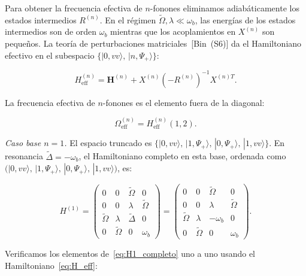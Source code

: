 \documentclass[12pt]{article}
\begin{document}
	Para obtener la frecuencia efectiva de $n$-fonones eliminamos adiab\'aticamente
	los estados intermedios $R^{(n)}$. En el r\'egimen $\widetilde{\Omega},
	\lambda \ll \omega_b$, las energ\'ias de los estados intermedios son de orden
	$\omega_b$ mientras que los acoplamientos en $X^{(n)}$ son peque\~nos. La
	teor\'ia de perturbaciones matriciales~[Bin~(S6)] da el Hamiltoniano efectivo
	en el subespacio $\{|0, vv\rangle,\, |n, \Psi_+\rangle\}$:
	
	\begin{equation}
		H_{\mathrm{eff}}^{(n)} = \mathbf{H}^{(n)}
		+ X^{(n)}\!\left(-R^{(n)}\right)^{-1}\!X^{(n)T}.
		\label{eq:Heff_pert}
	\end{equation}
	
	\noindent
	La frecuencia efectiva de $n$-fonones es el elemento fuera de la diagonal:
	
	\begin{equation}
		\Omega_{\mathrm{eff}}^{(n)} = H_{\mathrm{eff}}^{(n)}(1,2).
	\end{equation}
	
	\medskip
	\noindent
	\textit{Caso base $n = 1$.}
	El espacio truncado es $\{|0, vv\rangle,\, |1, \Psi_+\rangle,\,
	|0, \Psi_+\rangle,\, |1, vv\rangle\}$.
	En resonancia $\widetilde{\Delta} = -\omega_b$, el Hamiltoniano completo en
	esta base, ordenada como $\bigl(|0,vv\rangle,\, |1,\Psi_+\rangle,\,
	|0,\Psi_+\rangle,\, |1,vv\rangle\bigr)$, es:
	
	\begin{equation}
		H^{(1)} = \begin{pmatrix}
			0 & 0 & \widetilde{\Omega} & 0 \\
			0 & 0 & \lambda & \widetilde{\Omega} \\
			\widetilde{\Omega} & \lambda & \widetilde{\Delta} & 0 \\
			0 & \widetilde{\Omega} & 0 & \omega_b
		\end{pmatrix}
		=
		\begin{pmatrix}
			0 & 0 & \widetilde{\Omega} & 0 \\
			0 & 0 & \lambda & \widetilde{\Omega} \\
			\widetilde{\Omega} & \lambda & -\omega_b & 0 \\
			0 & \widetilde{\Omega} & 0 & \omega_b
		\end{pmatrix}.
		\label{eq:H1_completo}
	\end{equation}
	
	\noindent
	Verificamos los elementos de~\eqref{eq:H1_completo} uno a uno usando
	el Hamiltoniano~\eqref{eq:H_eff}:
	
\end{document}
